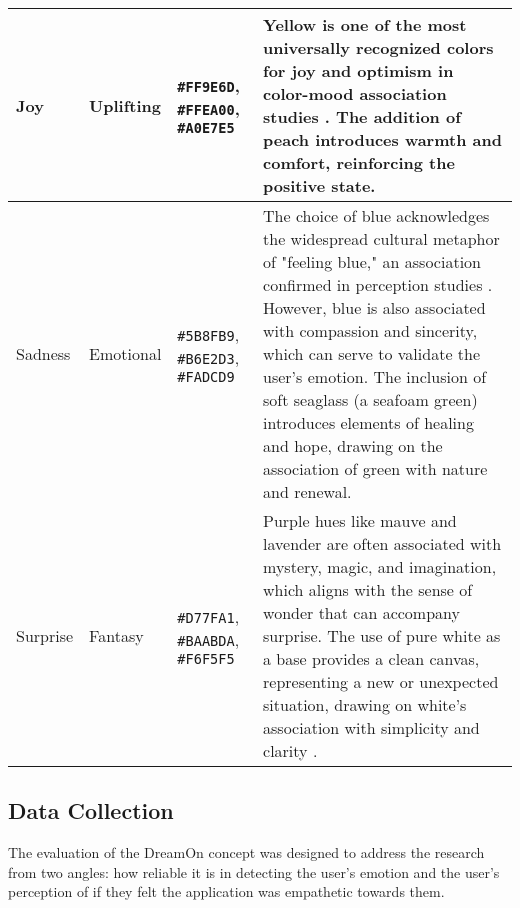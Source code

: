 \documentclass[conference]{IEEEtran}
\begin{document}
\begin{table*}[t]
\begin{tabular}{|p{}|p{}|p{}|p{}|}
			\hline
			Joy & Uplifting & \cellcolor{joyPrimary}\texttt{\#FF9E6D}, \cellcolor{joySecondary}\texttt{\#FFEA00}, \cellcolor{joyAccent}\texttt{\#A0E7E5} & Yellow is one of the most universally recognized colors for joy and optimism in color-mood association studies \cite{b2, b6}. The addition of peach introduces warmth and comfort, reinforcing the positive state. \\
			\hline
			Sadness & Emotional & \cellcolor{sadnessPrimary}\texttt{\#5B8FB9}, \cellcolor{sadnessSecondary}\texttt{\#B6E2D3}, \cellcolor{sadnessAccent}\texttt{\#FADCD9} & The choice of blue acknowledges the widespread cultural metaphor of "feeling blue," an association confirmed in perception studies \cite{b7}. However, blue is also associated with compassion and sincerity, which can serve to validate the user's emotion. The inclusion of soft seaglass (a seafoam green) introduces elements of healing and hope, drawing on the association of green with nature and renewal. \\
			\hline
			Surprise & Fantasy & \cellcolor{surprisePrimary}\texttt{\#D77FA1}, \cellcolor{surpriseSecondary}\texttt{\#BAABDA}, \cellcolor{surpriseAccent}\texttt{\#F6F5F5} & Purple hues like mauve and lavender are often associated with mystery, magic, and imagination, which aligns with the sense of wonder that can accompany surprise. The use of pure white as a base provides a clean canvas, representing a new or unexpected situation, drawing on white's association with simplicity and clarity \cite{b6}. \\
			\hline
		\end{tabular}
	\end{table*}
	
	\subsection{Data Collection}
	The evaluation of the DreamOn concept was designed to address the research from two angles: how reliable it is in detecting the user’s emotion and the user’s perception of if they felt the application was empathetic towards them.
	
\end{document}
